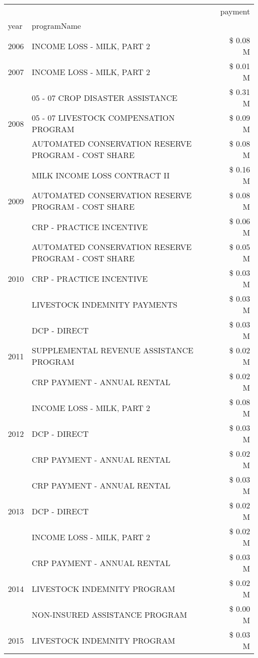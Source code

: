 \begin{tabular}{llr}
\toprule
 &  & payment \\
year & programName &  \\
\midrule
2006 & INCOME LOSS - MILK, PART 2 & \$ 0.08 M \\
\cline{1-3}
2007 & INCOME LOSS - MILK, PART 2 & \$ 0.01 M \\
\cline{1-3}
\multirow[t]{3}{*}{2008} & 05 - 07 CROP DISASTER ASSISTANCE & \$ 0.31 M \\
 & 05 - 07 LIVESTOCK COMPENSATION PROGRAM & \$ 0.09 M \\
 & AUTOMATED CONSERVATION RESERVE PROGRAM - COST SHARE & \$ 0.08 M \\
\cline{1-3}
\multirow[t]{3}{*}{2009} & MILK INCOME LOSS CONTRACT II & \$ 0.16 M \\
 & AUTOMATED CONSERVATION RESERVE PROGRAM - COST SHARE & \$ 0.08 M \\
 & CRP - PRACTICE INCENTIVE & \$ 0.06 M \\
\cline{1-3}
\multirow[t]{3}{*}{2010} & AUTOMATED CONSERVATION RESERVE PROGRAM - COST SHARE & \$ 0.05 M \\
 & CRP - PRACTICE INCENTIVE & \$ 0.03 M \\
 & LIVESTOCK INDEMNITY PAYMENTS & \$ 0.03 M \\
\cline{1-3}
\multirow[t]{3}{*}{2011} & DCP - DIRECT & \$ 0.03 M \\
 & SUPPLEMENTAL REVENUE ASSISTANCE PROGRAM & \$ 0.02 M \\
 & CRP PAYMENT - ANNUAL RENTAL & \$ 0.02 M \\
\cline{1-3}
\multirow[t]{3}{*}{2012} & INCOME LOSS - MILK, PART 2 & \$ 0.08 M \\
 & DCP - DIRECT & \$ 0.03 M \\
 & CRP PAYMENT - ANNUAL RENTAL & \$ 0.02 M \\
\cline{1-3}
\multirow[t]{3}{*}{2013} & CRP PAYMENT - ANNUAL RENTAL & \$ 0.03 M \\
 & DCP - DIRECT & \$ 0.02 M \\
 & INCOME LOSS - MILK, PART 2 & \$ 0.02 M \\
\cline{1-3}
\multirow[t]{3}{*}{2014} & CRP PAYMENT - ANNUAL RENTAL & \$ 0.03 M \\
 & LIVESTOCK INDEMNITY PROGRAM & \$ 0.02 M \\
 & NON-INSURED ASSISTANCE PROGRAM & \$ 0.00 M \\
\cline{1-3}
\multirow[t]{3}{*}{2015} & LIVESTOCK INDEMNITY PROGRAM & \$ 0.03 M \\

\end{tabular}
